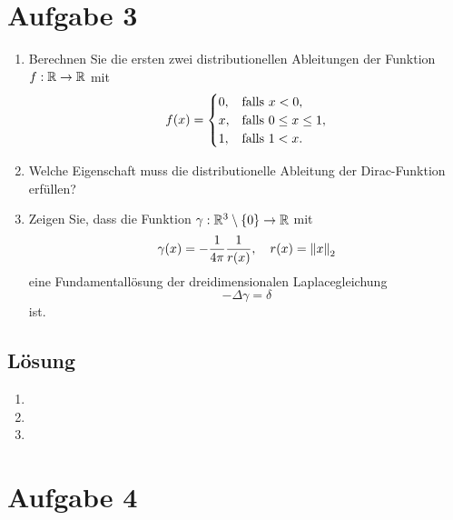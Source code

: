 \documentclass{exercise}
\begin{document}
    \section*{Aufgabe 3}
    
    \begin{problem}
        \begin{enumerate}
            \item Berechnen Sie die ersten zwei distributionellen Ableitungen der Funktion \(f: \R \to \R\) mit
            \[
                f\parentheses*{x} = \begin{cases}
                    0, & \text{falls }x < 0,\\
                    x, & \text{falls }0 \le x \le 1,\\
                    1, & \text{falls }1 < x.
                \end{cases}
            \]
            \item Welche Eigenschaft muss die distributionelle Ableitung der Dirac-Funktion erfüllen?
            \item Zeigen Sie, dass die Funktion \(\gamma: \R^3 \setminus \braces*{0} \to \R\) mit
            \[
                \gamma\parentheses*{x} = -\frac{1}{4\pi}\frac{1}{r\parentheses*{x}}, \quad r\parentheses*{x} = \norm*{x}_2
            \]
            eine Fundamentallösung der dreidimensionalen Laplacegleichung
            \[
                -\Delta\gamma = \delta
            \]
            ist.
        \end{enumerate}
    \end{problem}
    
    \subsection*{Lösung}
    \begin{enumerate}
        \item
        \item
        \item
    \end{enumerate}


    \section*{Aufgabe 4}
    
\end{document}
